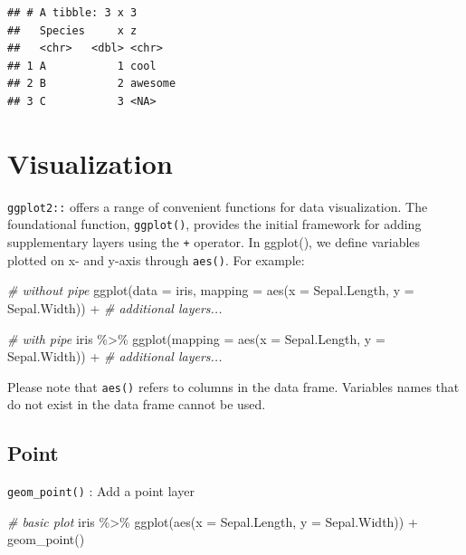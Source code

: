 \documentclass[
]{book}
\newenvironment{Shaded}{\begin{snugshade}}{\end{snugshade}}
\newcommand{\AttributeTok}[1]{\textcolor[rgb]{0.77,0.63,0.00}{#1}}
\newcommand{\CommentTok}[1]{\textcolor[rgb]{0.56,0.35,0.01}{\textit{#1}}}
\newcommand{\FunctionTok}[1]{\textcolor[rgb]{0.00,0.00,0.00}{#1}}
\newcommand{\NormalTok}[1]{#1}
\newcommand{\SpecialCharTok}[1]{\textcolor[rgb]{0.00,0.00,0.00}{#1}}
\begin{document}
\begin{verbatim}
## # A tibble: 3 x 3
##   Species     x z      
##   <chr>   <dbl> <chr>  
## 1 A           1 cool   
## 2 B           2 awesome
## 3 C           3 <NA>
\end{verbatim}

\hypertarget{visualization}{%
\section{Visualization}\label{visualization}}

\texttt{ggplot2::} offers a range of convenient functions for data visualization. The foundational function, \texttt{ggplot()}, provides the initial framework for adding supplementary layers using the \texttt{+} operator. In ggplot(), we define variables plotted on x- and y-axis through \texttt{aes()}. For example:

\begin{Shaded}
\begin{Highlighting}[]
\CommentTok{\# without pipe}
\FunctionTok{ggplot}\NormalTok{(}\AttributeTok{data =}\NormalTok{ iris,}
       \AttributeTok{mapping =} \FunctionTok{aes}\NormalTok{(}\AttributeTok{x =}\NormalTok{ Sepal.Length,}
                     \AttributeTok{y =}\NormalTok{ Sepal.Width)) }\SpecialCharTok{+}
  \CommentTok{\# additional layers...}

\CommentTok{\# with pipe}
\NormalTok{iris }\SpecialCharTok{\%\textgreater{}\%} 
  \FunctionTok{ggplot}\NormalTok{(}\AttributeTok{mapping =} \FunctionTok{aes}\NormalTok{(}\AttributeTok{x =}\NormalTok{ Sepal.Length,}
                       \AttributeTok{y =}\NormalTok{ Sepal.Width)) }\SpecialCharTok{+}
  \CommentTok{\# additional layers...  }
\end{Highlighting}
\end{Shaded}

Please note that \texttt{aes()} refers to columns in the data frame. Variables names that do not exist in the data frame cannot be used.

\hypertarget{point}{%
\subsection{Point}\label{point}}

\texttt{geom\_point()} : Add a point layer

\begin{Shaded}
\begin{Highlighting}[]
\CommentTok{\# basic plot}
\NormalTok{iris }\SpecialCharTok{\%\textgreater{}\%} 
  \FunctionTok{ggplot}\NormalTok{(}\FunctionTok{aes}\NormalTok{(}\AttributeTok{x =}\NormalTok{ Sepal.Length,}
             \AttributeTok{y =}\NormalTok{ Sepal.Width)) }\SpecialCharTok{+}
  \FunctionTok{geom\_point}\NormalTok{()}
\end{Highlighting}
\end{Shaded}
\end{document}
